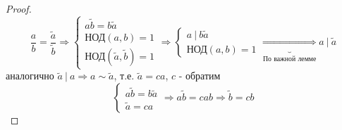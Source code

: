 \documentclass[a4paper, 12pt]{article}
\theoremstyle{definition}
\begin{document}
  \begin{proof}
    $$\frac{a}{b} = \frac{\widetilde{a}}{\widetilde{b}} \Longrightarrow \begin{cases}
      a \widetilde{b} = b \widetilde{a}\\
      \text{НОД}(a, b) = 1\\
      \text{НОД}(\widetilde{a}, \widetilde{b}) = 1
    \end{cases} \Longrightarrow \begin{cases}
      a \ | \ b \widetilde{a}\\
      \text{НОД}(a, b) = 1
    \end{cases} \underbrace{\Longrightarrow }_{\text{По важной лемме}} a \ | \ \widetilde{a} $$
    аналогично $\widetilde{a} \ | \ a \Longrightarrow a \sim \widetilde{a}$, т.е. $\widetilde{a} = ca$, $c$ - обратим
    $$\begin{cases}
      a \widetilde{b} = b \widetilde{a}\\
      \widetilde{a} = ca
    \end{cases} \Longrightarrow a \widetilde{b} = cab \Longrightarrow \widetilde{b} = cb$$
  \end{proof}
\end{document}
